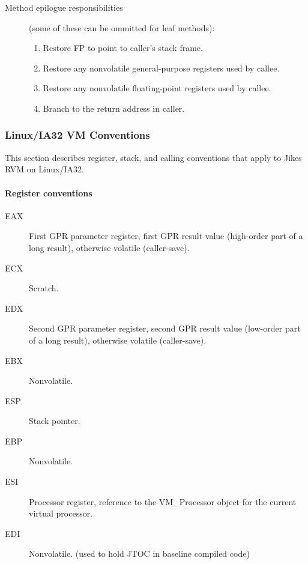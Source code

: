 \begin{description}
\item[Method epilogue responsibilities] (some of these can be
ommitted for leaf methods):

\begin{enumerate}
\item Restore FP to point to caller's stack frame.

\item Restore any nonvolatile general-purpose registers used by callee.

\item Restore any nonvolatile floating-point registers used by callee.

\item Branch to the return address in caller.
\end{enumerate}
\end{description}

\subsubsection{Linux/IA32 VM Conventions} \label{lintel-conventions}

This section describes register, stack, and calling conventions that
apply to Jikes RVM on Linux\Rweb{}/IA32.  

\paragraph{Register conventions}

\begin{description}
\item[EAX]
    First GPR parameter register, first GPR result value (high-order part
    of a long result), otherwise volatile (caller-save).

\item[ECX]
    Scratch.

\item[EDX]
    Second GPR parameter register, second GPR result value (low-order part
    of a long result), otherwise volatile (caller-save).

\item[EBX]
    Nonvolatile.

\item[ESP]
    Stack pointer.

\item[EBP]
    Nonvolatile.

\item[ESI]
    Processor register, reference to the VM\_Processor object for the current
    virtual processor.

\item[EDI]
    Nonvolatile.  (used to hold JTOC in baseline compiled code)

\end{description}

